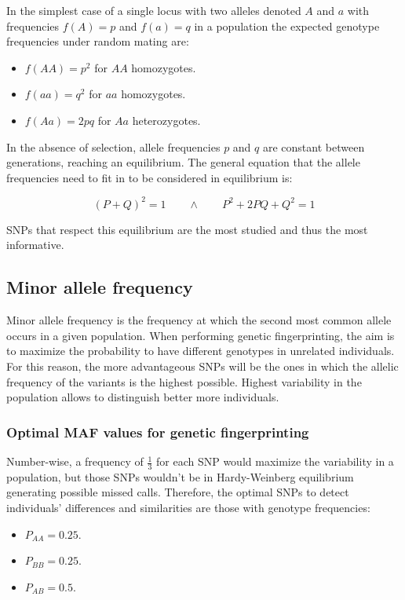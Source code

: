 	In the simplest case of a single locus with two alleles denoted $A$ and $a$ with frequencies $f(A) = p$ and $f(a) = q$ in a population the expected genotype frequencies under random mating are:

	\begin{multicols}{3}
		\begin{itemize}
			\item $f(AA) = p^{2}$ for $AA$ homozygotes.
			\item $f(aa) = q^{2}$ for $aa$ homozygotes.
			\item $f(Aa) = 2pq$ for $Aa$ heterozygotes.
		\end{itemize}
	\end{multicols}

	In the absence of selection, allele frequencies $p$ and $q$ are constant between generations, reaching an equilibrium.
	The general equation that the allele frequencies need to fit in to be considered in equilibrium is:

	$$( P + Q )^2 = 1 \qquad\land\qquad P^2 + 2PQ + Q^2 = 1$$

	SNPs that respect this equilibrium are the most studied and thus the most informative.

	\subsection{Minor allele frequency}
	Minor allele frequency is the frequency at which the second most common allele occurs in a given population.
	When performing genetic fingerprinting, the aim is to maximize the probability to have different genotypes in unrelated individuals.
	For this reason, the more advantageous SNPs will be the ones in which the allelic frequency of the variants is the highest possible.
	Highest variability in the population allows to distinguish better more individuals.

		\subsubsection{Optimal MAF values for genetic fingerprinting}
		Number-wise, a frequency of $\frac{1}{3}$ for each SNP would maximize the variability in a population, but those SNPs wouldn't be in Hardy-Weinberg equilibrium generating possible missed calls.
		Therefore, the optimal SNPs to detect individuals’ differences and similarities are those with genotype frequencies:

		\begin{multicols}{3}
			\begin{itemize}
				\item $P_{AA} = 0.25$.
				\item $P_{BB} = 0.25$.
				\item $P_{AB} = 0.5$.
			\end{itemize}
		\end{multicols}

